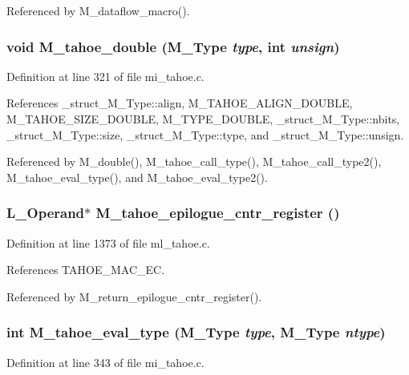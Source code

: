 Referenced by M\_\-dataflow\_\-macro().
\subsubsection{\setlength{\rightskip}{0pt plus 5cm}void M\_\-tahoe\_\-double (\bf{M\_\-Type} {\em type}, int {\em unsign})}\label{m__tahoe_8h_1fc682be85697c234eb6afb9fda2b2e1}




Definition at line 321 of file mi\_\-tahoe.c.

References \_\-struct\_\-M\_\-Type::align, M\_\-TAHOE\_\-ALIGN\_\-DOUBLE, M\_\-TAHOE\_\-SIZE\_\-DOUBLE, M\_\-TYPE\_\-DOUBLE, \_\-struct\_\-M\_\-Type::nbits, \_\-struct\_\-M\_\-Type::size, \_\-struct\_\-M\_\-Type::type, and \_\-struct\_\-M\_\-Type::unsign.

Referenced by M\_\-double(), M\_\-tahoe\_\-call\_\-type(), M\_\-tahoe\_\-call\_\-type2(), M\_\-tahoe\_\-eval\_\-type(), and M\_\-tahoe\_\-eval\_\-type2().
\subsubsection{\setlength{\rightskip}{0pt plus 5cm}L\_\-Operand$\ast$ M\_\-tahoe\_\-epilogue\_\-cntr\_\-register ()}\label{m__tahoe_8h_47dd2f6b01fb0ccce422726ed0408e4b}




Definition at line 1373 of file ml\_\-tahoe.c.

References TAHOE\_\-MAC\_\-EC.

Referenced by M\_\-return\_\-epilogue\_\-cntr\_\-register().
\subsubsection{\setlength{\rightskip}{0pt plus 5cm}int M\_\-tahoe\_\-eval\_\-type (\bf{M\_\-Type} {\em type}, \bf{M\_\-Type} {\em ntype})}\label{m__tahoe_8h_a7478431ced7155d3fc52a21a3f8e811}




Definition at line 343 of file mi\_\-tahoe.c.

